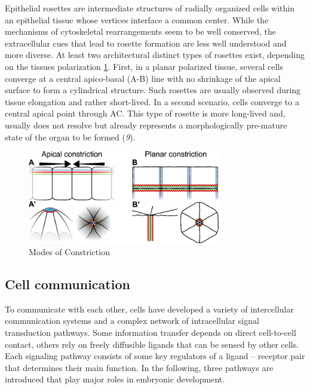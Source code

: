 \documentclass[11pt,singlespacinge,twoside]{reedthesis} %
\begin{document}
Epithelial rosettes are intermediate structures of radially organized cells within an epithelial tissue whose vertices interface a common center. While the mechanisms of cytoskeletal rearrangements seem to be well conserved, the extracellular cues that lead to rosette formation are less well understood and more diverse.
At least two architectural distinct types of rosettes exist, depending on the tissues polarization \ref{fig:constr}. First, in a planar polarized tissue, several cells converge at a central apico-basal (A-B) line with no shrinkage of the apical surface to form a cylindrical structure. Such rosettes are usually observed during tissue elongation and rather short-lived. In a second scenario, cells converge to a central apical point through AC. This type of rosette is more long-lived and, usually does not resolve but already represents a morphologically pre-mature state of the organ to be formed (\emph{9}).
\begin{figure}

{\centering \includegraphics[width=0.75\textwidth]{figures/intro/constriction} 

}

\caption{Modes of Constriction}\label{fig:constr}
\end{figure}
\hypertarget{cell-communication}{%
\subsection{Cell communication}\label{cell-communication}}

To communicate with each other, cells have developed a variety of intercellular communication systems and a complex network of intracellular signal transduction pathways. Some information transfer depends on direct cell-to-cell contact, others rely on freely diffusible ligands that can be sensed by other cells. Each signaling pathway consists of some key regulators of a ligand -- receptor pair that determines their main function. In the following, three pathways are introduced that play major roles in embryonic development.
\end{document}
